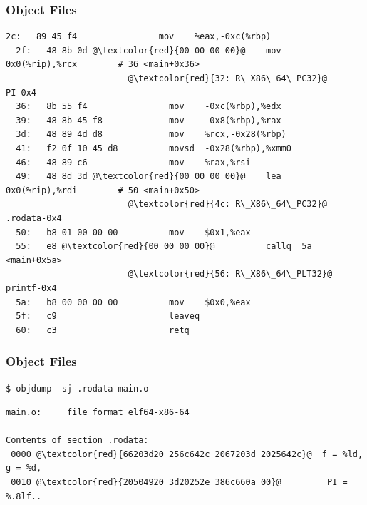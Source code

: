 \documentclass{beamer}
\begin{document}
\begin{frame}[fragile]
\frametitle{Object Files}
\tiny
\begin{lstlisting}[numbers=none]
  2c:   89 45 f4                mov    %eax,-0xc(%rbp)
  2f:   48 8b 0d @\textcolor{red}{00 00 00 00}@    mov    0x0(%rip),%rcx        # 36 <main+0x36>
                        @\textcolor{red}{32: R\_X86\_64\_PC32}@       PI-0x4
  36:   8b 55 f4                mov    -0xc(%rbp),%edx
  39:   48 8b 45 f8             mov    -0x8(%rbp),%rax
  3d:   48 89 4d d8             mov    %rcx,-0x28(%rbp)
  41:   f2 0f 10 45 d8          movsd  -0x28(%rbp),%xmm0
  46:   48 89 c6                mov    %rax,%rsi
  49:   48 8d 3d @\textcolor{red}{00 00 00 00}@    lea    0x0(%rip),%rdi        # 50 <main+0x50>
                        @\textcolor{red}{4c: R\_X86\_64\_PC32}@       .rodata-0x4
  50:   b8 01 00 00 00          mov    $0x1,%eax
  55:   e8 @\textcolor{red}{00 00 00 00}@          callq  5a <main+0x5a>
                        @\textcolor{red}{56: R\_X86\_64\_PLT32}@      printf-0x4
  5a:   b8 00 00 00 00          mov    $0x0,%eax
  5f:   c9                      leaveq
  60:   c3                      retq
\end{lstlisting}

\end{frame}

\begin{frame}[fragile]
\frametitle{Object Files}
\scriptsize
\begin{verbatim}
$ objdump -sj .rodata main.o
\end{verbatim}

\begin{lstlisting}[numbers=none]
main.o:     file format elf64-x86-64

Contents of section .rodata:
 0000 @\textcolor{red}{66203d20 256c642c 2067203d 2025642c}@  f = %ld, g = %d,
 0010 @\textcolor{red}{20504920 3d20252e 386c660a 00}@         PI = %.8lf..
\end{lstlisting}

\end{frame}
\end{document}
